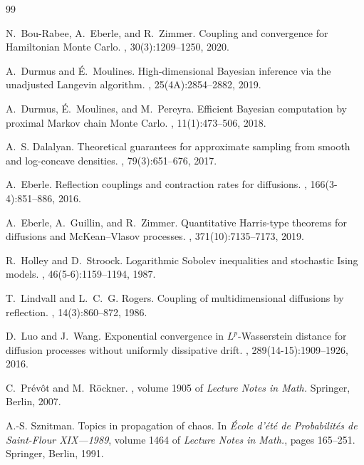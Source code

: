 \documentclass[11pt]{article}
\theoremstyle{definition}
\begin{document}
\begin{thebibliography}{99}

N.~Bou-Rabee, A.~Eberle, and R.~Zimmer.
\newblock Coupling and convergence for Hamiltonian Monte Carlo.
, 30(3):1209--1250, 2020.

A.~Durmus and \'E.~Moulines.
\newblock High-dimensional {B}ayesian inference via the unadjusted {L}angevin algorithm.
, 25(4A):2854--2882, 2019.

A.~Durmus, \'E.~Moulines, and M.~Pereyra.
\newblock Efficient {B}ayesian computation by proximal {M}arkov chain {M}onte {C}arlo.
, 11(1):473--506, 2018.

A.~S. Dalalyan.
\newblock Theoretical guarantees for approximate sampling from smooth and log-concave densities.
, 79(3):651--676, 2017.

A.~Eberle.
\newblock Reflection couplings and contraction rates for diffusions.
, 166(3-4):851--886, 2016.

A.~Eberle, A.~Guillin, and R.~Zimmer.
\newblock Quantitative {H}arris-type theorems for diffusions and {M}c{K}ean--{V}lasov processes.
, 371(10):7135--7173, 2019.

R.~Holley and D.~Stroock.
\newblock Logarithmic {S}obolev inequalities and stochastic {I}sing models.
, 46(5-6):1159--1194, 1987.

T.~Lindvall and L.~C.~G. Rogers.
\newblock Coupling of multidimensional diffusions by reflection.
, 14(3):860--872, 1986.

D.~Luo and J.~Wang.
\newblock Exponential convergence in ${L}^p$-{W}asserstein distance for diffusion processes without uniformly dissipative drift.
, 289(14-15):1909--1926, 2016.

C.~Pr\'ev\^ot and M.~R\"ockner.
, volume 1905 of {\em Lecture Notes in Math.}
\newblock Springer, Berlin, 2007.

A.-S. Sznitman.
\newblock Topics in propagation of chaos.
\newblock In {\em \'Ecole d'\'et\'e de Probabilit\'es de Saint-Flour XIX---1989}, volume 1464 of {\em Lecture Notes in Math.}, pages 165--251. Springer, Berlin, 1991.


\end{thebibliography}
\end{document}
